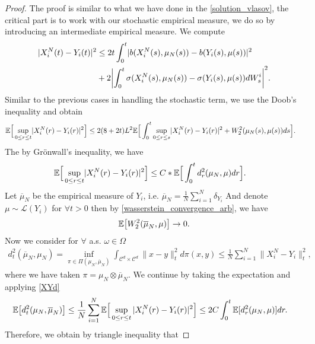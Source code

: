 \begin{proof}
  The proof is similar to what we have done in the \autoref{solution_vlasov}, the critical part is to 
  work with our stochastic empirical measure, we do so by introducing an intermediate empirical measure. We compute 
  \begin{align*}
    \abs{X_i^{N}(t) - Y_i(t) }^2 &\le 2 t \int_0^{t} \abs{b(X^{N}_i(s),\mu_N(s) ) -  b(Y_i(s),\mu(s) )}^2 \\
    &+ 2 \abs*{\int_0^{t} \sigma(X_i^{N}(s),\mu_N(s) ) - \sigma(Y_i(s),\mu(s))  dW_s^{i} }^2
  .\end{align*}
Similar to the previous cases in handling the stochastic term, we use the Doob's inequality and obtain
  \begin{align*}
\mathbb{E}\Big[\sup_{0\le r\le t} \lvert X_i^{N}(r) - Y_i(r) \rvert^2\Big] &\le 2(8+2t) L^2 \mathbb{E}\Big[\int_0^{t}\sup_{0\le r\le s} \lvert X_i^{N}(r) - Y_i(r) \rvert^2+ W_2^{2}(\mu_N(s),\mu(s))   ds\Big].
\end{align*}
The by Grönwall's inequality, we have
\begin{align}\label{XYd}
      \mathbb{E}\Big[\sup_{0\le r\le t} \lvert X_i^{N}(r) - Y_i(r) \rvert^2\Big]                                              &\le  C*\mathbb{E}\Big[\int_0^{t} d_r^2(\mu_N,\mu ) dr\Big]
.\end{align}
  Let $\overline{\mu }_N $ be the empirical measure of $Y_i$, i.e. $
    \overline{\mu }_N = \frac{1}{N} \sum_{i=1}^{N} \delta_{Y_i}  $
 And denote $\mu \sim \mathcal{L}(Y_i)$ for $\forall  t > 0$ then by \autoref{wasserstein_convergence_arb}, we have 
  \begin{align*}
    \mathbb{E}\big[W_2^2(\overline{\mu }_N,\mu  )\big] \to  0
  .\end{align*}
  Now we consider for $\forall $ a.s. $\omega  \in  \Omega $
  \begin{align*}
    d_t^2(\overline{\mu }_N,\mu_N ) = \inf_{\pi  \in  \Pi(\mu_N,\overline{\mu }_N )} \int_{\mathcal{C}^{d} \times  \mathcal{C}^{d}  } \|x-y\|^2_t d\pi(x,y)  \le \frac{1}{N} \sum_{i=1}^{N} \|X^{N}_i - Y_i \|_t^2 
  ,\end{align*}
  where we have taken $\pi  = \mu_N \otimes \overline{\mu }_N $.
  We continue by taking the expectation and applying \autoref{XYd}
  \begin{align*}
    \mathbb{E}\big[d_t^2(\mu_N,\overline{\mu }_N )\big] &\le  \frac{1}{N} \sum_{i=1}^{N} \mathbb{E}\Big[\sup_{0\le r \le t} |X_i^N(r) - Y_i(r) |^2\Big] \le 2C\int_0^{t} \mathbb{E}[d_r^2(\mu_N,\mu )] dr 
  .\end{align*}
Therefore, we obtain by triangle inequality that

\end{proof}
